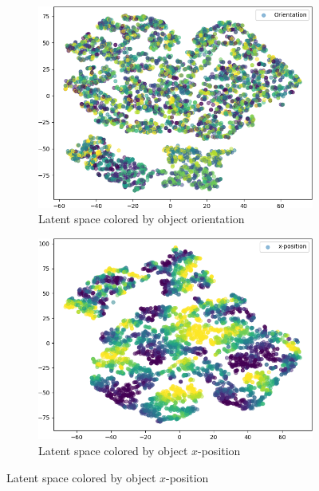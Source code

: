 \begin{figure}[H]
\begin{subfigure}{.19\textwidth}
        \label{subfig:vae_embedding_dsprites_scale}
    \end{subfigure}
    \hfill
    \begin{subfigure}{.19\textwidth}
        \includegraphics[width=\textwidth]{images/latent_spaces/dsprites/vae_gan/embeddings_mu_2.png}
        \caption{Latent space colored by object orientation}
        \label{subfig:vae_embedding_dsprites_orientation}
    \end{subfigure}
    \hfill
    \begin{subfigure}{.19\textwidth}
        \includegraphics[width=\textwidth]{images/latent_spaces/dsprites/vae_gan/embeddings_mu_3.png}
        \caption{Latent space colored by object $x$-position}
    \end{subfigure}

\end{figure}
